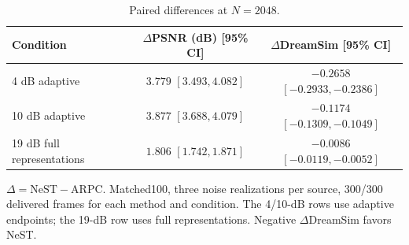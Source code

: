 \begin{table}[t]
\centering
\caption{Paired differences at $N=2048$.}
\label{tab:larger-budget}
\begingroup
\fontsize{8}{9.5}\selectfont
\setlength{\tabcolsep}{3pt}
\begin{tabular}{@{}l c c@{}}
\toprule
Condition & \shortstack{$\Delta$PSNR (dB)\\{[95\% CI]}} & \shortstack{$\Delta$DreamSim\\{[95\% CI]}} \\
\midrule
4 dB adaptive & \shortstack{$3.779$\\[1pt]$[3.493, 4.082]$} & \shortstack{$-0.2658$\\[1pt]$[-0.2933, -0.2386]$} \\[3pt]
10 dB adaptive & \shortstack{$3.877$\\[1pt]$[3.688, 4.079]$} & \shortstack{$-0.1174$\\[1pt]$[-0.1309, -0.1049]$} \\[3pt]
19 dB full representations & \shortstack{$1.806$\\[1pt]$[1.742, 1.871]$} & \shortstack{$-0.0086$\\[1pt]$[-0.0119, -0.0052]$} \\[3pt]
\bottomrule
\end{tabular}
\endgroup
\par\smallskip
\begin{minipage}{\linewidth}\fontsize{7.5}{9}\selectfont
$\Delta=\mathrm{NeST}-\mathrm{ARPC}$. Matched100, three noise realizations per source, 300/300 delivered frames for each method and condition. The 4/10-dB rows use adaptive endpoints; the 19-dB row uses full representations. Negative $\Delta$DreamSim favors NeST.
\end{minipage}
\end{table}
